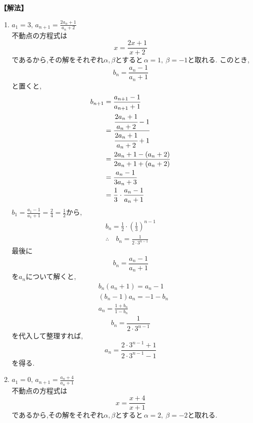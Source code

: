 \documentclass[dvipdfmx,a4paper,11pt,fleqn,openany]{jsbook}
\begin{document}
      \noindent\textbf{【解法】}
      \begin{enumerate}[label=(\arabic*),parsep=3pt]
        \item $\displaystyle a_1=3,\, a_{n+1}=\frac{2a_n+1}{a_n+2}$\\
              不動点の方程式は
              \[
                x=\frac{2x+1}{x+2}
              \]
              であるから,その解をそれぞれ$\alpha,\beta$とすると\,$\alpha=1,\ \beta=-1$と取れる.
              このとき,
              \[
                b_n=\frac{a_n-1}{a_n+1}
              \]
              と置くと,
              \begin{align*}
                b_{n+1}&=\frac{a_{n+1}-1}{a_{n+1}+1}\\
                &=\cfrac{\cfrac{2a_n+1}{a_n+2}-1}{\cfrac{2a_n+1}{a_n+2}+1}\\
                &=\frac{2a_n+1-(a_n+2)}{2a_n+1+(a_n+2)}\\
                &=\frac{a_n-1}{3a_n+3}\\
                &=\frac{1}{3}\cdot \frac{a_n-1}{a_n+1}
              \end{align*}
              $\displaystyle b_1=\frac{a_1-1}{a_1+1}=\frac{2}{4}=\frac{1}{2}$から,
              \begin{align*}
                b_{n}=\frac{1}{2}\cdot\left(\frac{1}{3}\right)^{n-1}\\
                \therefore \quad b_n=\frac{1}{2\cdot3^{n-1}}
              \end{align*}
              最後に
              \[
                b_n=\frac{a_n-1}{a_n+1}
              \]
              を$a_n$について解くと,
              \begin{align*}
                &b_n(a_n+1)=a_n-1\\
                &(b_n-1)a_n=-1-b_n\\
                &a_n=\frac{1+b_n}{1-b_n}
              \end{align*}
              \[
                b_n=\frac{1}{2\cdot3^{n-1}}
              \]
              を代入して整理すれば,
              \[
                a_n=\frac{2\cdot3^{n-1}+1}{2\cdot3^{n-1}-1}
              \]
              を得る.
        \item $\displaystyle a_1=0,\, a_{n+1}=\frac{a_n+4}{a_n+1}$\\
              不動点の方程式は
              \[
                x=\frac{x+4}{x+1}
              \]
              であるから,その解をそれぞれ$\alpha,\beta$とすると\,$\alpha=2,\ \beta=-2$と取れる.

\end{enumerate}
\end{document}
